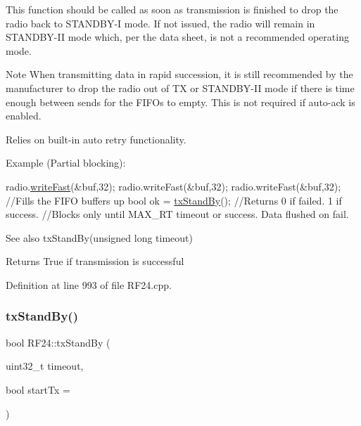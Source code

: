 This function should be called as soon as transmission is finished to drop the radio back to S\+T\+A\+N\+D\+B\+Y-\/I mode. If not issued, the radio will remain in S\+T\+A\+N\+D\+B\+Y-\/\+II mode which, per the data sheet, is not a recommended operating mode.

\begin{DoxyNote}{Note}
When transmitting data in rapid succession, it is still recommended by the manufacturer to drop the radio out of TX or S\+T\+A\+N\+D\+B\+Y-\/\+II mode if there is time enough between sends for the F\+I\+F\+Os to empty. This is not required if auto-\/ack is enabled.
\end{DoxyNote}
Relies on built-\/in auto retry functionality.


\begin{DoxyCode}
Example (Partial blocking):

        radio.\hyperlink{classRF24_a47b2516993481b58e724d1274a7fd9cb}{writeFast}(&buf,32);
        radio.writeFast(&buf,32);
        radio.writeFast(&buf,32);  \textcolor{comment}{//Fills the FIFO buffers up}
        \textcolor{keywordtype}{bool} ok = \hyperlink{classRF24_a12cc453453c94969d4d3f0edb3778c83}{txStandBy}();     \textcolor{comment}{//Returns 0 if failed. 1 if success.}
                                   \textcolor{comment}{//Blocks only until MAX\_RT timeout or success. Data flushed on fail.}
\end{DoxyCode}
 \begin{DoxySeeAlso}{See also}
tx\+Stand\+By(unsigned long timeout) 
\end{DoxySeeAlso}
\begin{DoxyReturn}{Returns}
True if transmission is successful 
\end{DoxyReturn}


Definition at line 993 of file R\+F24.\+cpp.

\mbox{\label{classRF24_ab7f54decbe9d06cb026a5d3dfb505116}} 
\subsubsection{\texorpdfstring{tx\+Stand\+By()}{txStandBy()}\hspace{0.1cm}{\footnotesize\ttfamily [2/2]}}
{\footnotesize\ttfamily bool R\+F24\+::tx\+Stand\+By (\begin{DoxyParamCaption}\item[{uint32\+\_\+t}]{timeout,  }\item[{bool}]{start\+Tx = {} }\end{DoxyParamCaption})}

